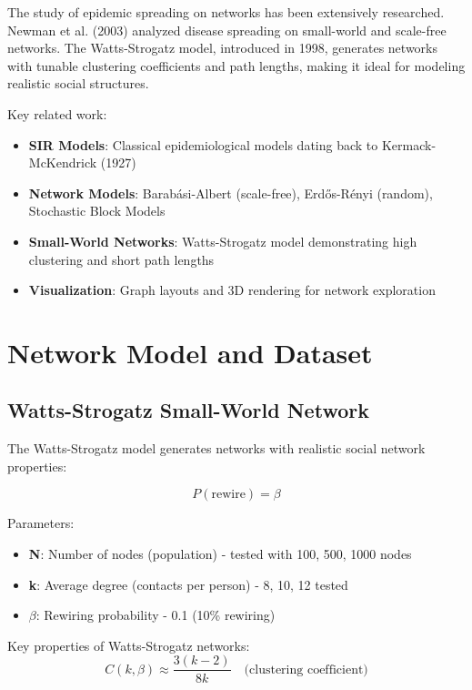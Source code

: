 \documentclass[12pt,a4paper]{article}
\begin{document}
The study of epidemic spreading on networks has been extensively researched. Newman et al. (2003) analyzed disease spreading on small-world and scale-free networks. The Watts-Strogatz model, introduced in 1998, generates networks with tunable clustering coefficients and path lengths, making it ideal for modeling realistic social structures.

Key related work:
\begin{itemize}
    \item \textbf{SIR Models}: Classical epidemiological models dating back to Kermack-McKendrick (1927)
    \item \textbf{Network Models}: Barabási-Albert (scale-free), Erdős-Rényi (random), Stochastic Block Models
    \item \textbf{Small-World Networks}: Watts-Strogatz model demonstrating high clustering and short path lengths
    \item \textbf{Visualization}: Graph layouts and 3D rendering for network exploration
\end{itemize}

\section{Network Model and Dataset}

\subsection{Watts-Strogatz Small-World Network}

The Watts-Strogatz model generates networks with realistic social network properties:

\begin{equation}
P(\text{rewire}) = \beta
\end{equation}

Parameters:
\begin{itemize}
    \item \textbf{N}: Number of nodes (population) - tested with 100, 500, 1000 nodes
    \item \textbf{k}: Average degree (contacts per person) - 8, 10, 12 tested
    \item \textbf{$\beta$}: Rewiring probability - 0.1 (10\% rewiring)
\end{itemize}

Key properties of Watts-Strogatz networks:
\begin{equation}
C(k, \beta) \approx \frac{3(k-2)}{8k} \quad \text{(clustering coefficient)}
\end{equation}
\end{document}
